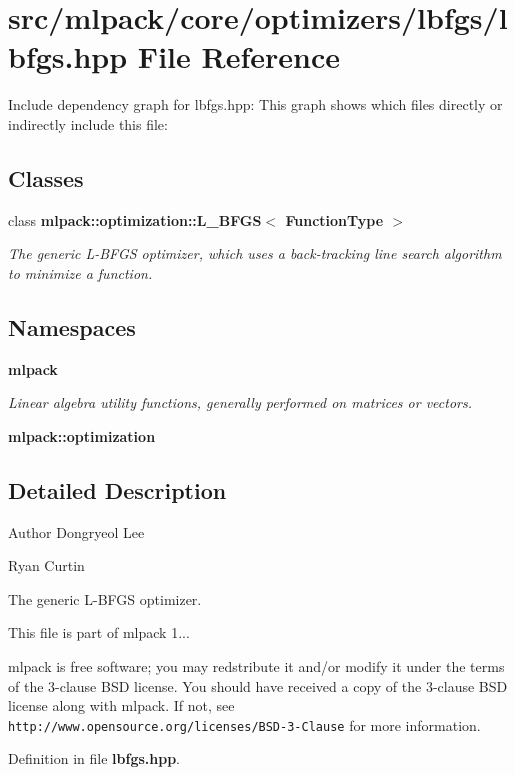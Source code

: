 \section{src/mlpack/core/optimizers/lbfgs/lbfgs.hpp File Reference}
\label{lbfgs_8hpp}
Include dependency graph for lbfgs.\-hpp\-:
This graph shows which files directly or indirectly include this file\-:
\subsection*{Classes}
\begin{DoxyCompactItemize}
\item 
class {\bf mlpack\-::optimization\-::\-L\-\_\-\-B\-F\-G\-S$<$ Function\-Type $>$}
\begin{DoxyCompactList}\small\item\em The generic L-\/\-B\-F\-G\-S optimizer, which uses a back-\/tracking line search algorithm to minimize a function. \end{DoxyCompactList}\end{DoxyCompactItemize}
\subsection*{Namespaces}
\begin{DoxyCompactItemize}
\item 
{\bf mlpack}
\begin{DoxyCompactList}\small\item\em Linear algebra utility functions, generally performed on matrices or vectors. \end{DoxyCompactList}\item 
{\bf mlpack\-::optimization}
\end{DoxyCompactItemize}


\subsection{Detailed Description}
\begin{DoxyAuthor}{Author}
Dongryeol Lee 

Ryan Curtin
\end{DoxyAuthor}
The generic L-\/\-B\-F\-G\-S optimizer.

This file is part of mlpack 1...

mlpack is free software; you may redstribute it and/or modify it under the terms of the 3-\/clause B\-S\-D license. You should have received a copy of the 3-\/clause B\-S\-D license along with mlpack. If not, see {\tt http\-://www.\-opensource.\-org/licenses/\-B\-S\-D-\/3-\/\-Clause} for more information. 

Definition in file {\bf lbfgs.\-hpp}.

